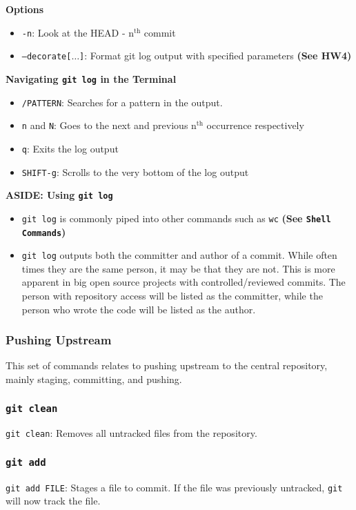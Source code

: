\documentclass[13pt]{article}
\begin{document}
\textbf{Options}
\begin{itemize}[label=]
\item \texttt{-n}: Look at the HEAD - n$^\text{th}$ commit
\item \texttt{--decorate[$\ldots$]}: Format git log output with specified parameters \textbf{(See HW4)}
\end{itemize}

\textbf{Navigating \texttt{git log} in the Terminal}
\begin{itemize}[label=]
\item \texttt{/PATTERN}: Searches for a pattern in the output.
\item \texttt{n} and \texttt{N}: Goes to the next and previous n$^\text{th}$ occurrence respectively
\item \texttt{q}: Exits the log output
\item \texttt{SHIFT-g}: Scrolls to the very bottom of the log output
\end{itemize}

\textbf{ASIDE: Using \texttt{git log}}
\begin{itemize}[label=]
\item \texttt{git log} is commonly piped into other commands such as \texttt{wc} \textbf{(See \texttt{Shell Commands})}
\item \texttt{git log} outputs both the committer and author of a commit. While often times they are the same person, it may be that they are not. This is more apparent in big open source projects with controlled/reviewed commits. The person with repository access will be listed as the committer, while the person who wrote the code will be listed as the author.
\end{itemize}






\subsubsection{Pushing Upstream}
This set of commands relates to pushing upstream to the central repository, mainly staging, committing, and pushing.

\subsubsection*{\texttt{git clean}}
\texttt{git clean}: Removes all untracked files from the repository.

\subsubsection*{\texttt{git add}}
\texttt{git add FILE}: Stages a file to commit. If the file was previously untracked, \texttt{git} will now track the file.
\end{document}
